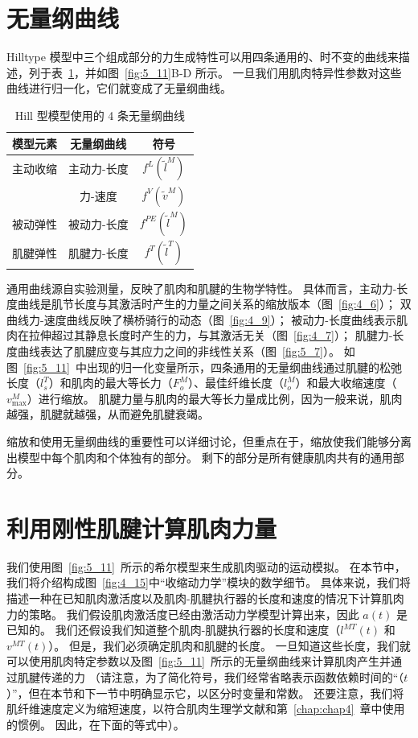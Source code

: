 \section{无量纲曲线}

Hilltype 模型中三个组成部分的力生成特性可以用四条通用的、时不变的曲线来描述，列于表~\ref{tab:5_3}，并如图~\ref{fig:5_11}B-D 所示。
一旦我们用肌肉特异性参数对这些曲线进行归一化，它们就变成了无量纲曲线。

\begin{table}[htbp]
	\caption{Hill 型模型使用的 4 条无量纲曲线} \label{tab:5_3} \centering
	\begin{tabular}{ccc} %
		\toprule
		\textbf{模型元素} & \textbf{无量纲曲线} & \textbf{符号}  \\
		\midrule
		主动收缩 & 主动力-长度 &  $f^L(\tilde{l} ^M)$ \\
		\midrule
		 & 力-速度 &  $f^V(\tilde{v} ^M)$ \\
		\midrule
		被动弹性 & 被动力-长度 &  $f^{PE}(\tilde{l} ^M)$ \\
		\midrule
		肌腱弹性 & 肌腱力-长度 &  $f^{T}(\tilde{l} ^T)$ \\
		\bottomrule
	\end{tabular}
\end{table}


通用曲线源自实验测量，反映了肌肉和肌腱的生物学特性。
具体而言，主动力-长度曲线是肌节长度与其激活时产生的力量之间关系的缩放版本（图~\ref{fig:4_6}）；
双曲线力-速度曲线反映了横桥骑行的动态（图~\ref{fig:4_9}）；
被动力-长度曲线表示肌肉在拉伸超过其静息长度时产生的力，与其激活无关（图~\ref{fig:4_7}）；
肌腱力-长度曲线表达了肌腱应变与其应力之间的非线性关系（图~\ref{fig:5_7}）。
如图~\ref{fig:5_11}~中出现的归一化变量所示，四条通用的无量纲曲线通过肌腱的松弛长度（$l_s^T$）和肌肉的最大等长力（$F_o^M$）、最佳纤维长度（$l_o^M$）和最大收缩速度（$v_\text{max} ^M$）进行缩放。
肌腱力量与肌肉的最大等长力量成比例，因为一般来说，肌肉越强，肌腱就越强，从而避免肌腱衰竭。


缩放和使用无量纲曲线的重要性可以详细讨论，但重点在于，缩放使我们能够分离出模型中每个肌肉和个体独有的部分。
剩下的部分是所有健康肌肉共有的通用部分。



\section{利用刚性肌腱计算肌肉力量}

我们使用图~\ref{fig:5_11}~所示的希尔模型来生成肌肉驱动的运动模拟。
在本节中，我们将介绍构成图~\ref{fig:4_15}中“收缩动力学”模块的数学细节。
具体来说，我们将描述一种在已知肌肉激活度以及肌肉-肌腱执行器的长度和速度的情况下计算肌肉力的策略。
我们假设肌肉激活度已经由激活动力学模型计算出来，因此 $a(t)$ 是已知的。
我们还假设我们知道整个肌肉-肌腱执行器的长度和速度（$l^{MT}(t)$ 和 $v^{MT}(t)$）。
但是，我们必须确定肌肉和肌腱的长度。
一旦知道这些长度，我们就可以使用肌肉特定参数以及图~\ref{fig:5_11}~所示的无量纲曲线来计算肌肉产生并通过肌腱传递的力
（请注意，为了简化符号，我们经常省略表示函数依赖时间的“（$t$）”，但在本节和下一节中明确显示它，以区分时变量和常数。
还要注意，我们将肌纤维速度定义为缩短速度，以符合肌肉生理学文献和第~\ref{chap:chap4}~章中使用的惯例。
因此，在下面的等式中）。


